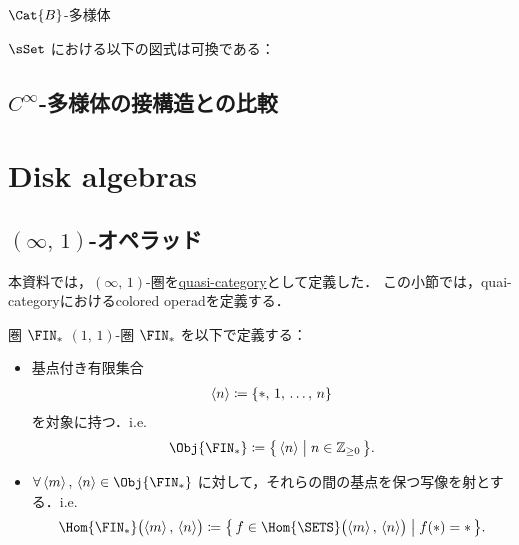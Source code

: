 \documentclass[TQFT_main]{subfiles}
\begin{document}
\begin{mydef}[label=def:B-mfld,breakable]{{$\Cat{B}$}-多様体}
\begin{itemize}
\begin{description}
            $\sSet$ における以下の図式は可換である：
            \begin{center}
            \end{center}
        \end{description}
    \end{itemize}
\end{mydef}

\subsection{$C^\infty$-多様体の接構造との比較}

\section{Disk algebras}

\subsection{{$(\infty,\, 1)$}-オペラッド}

本資料では，$(\infty,\, 1)$-圏を\hyperref[def:infinity-1]{quasi-category}として定義した．
この小節では，quai-categoryにおけるcolored operadを定義する．

\begin{mydef}[label=def:Fin]{圏 {$\FIN_*$}}
    $(1,\, 1)$-圏 $\FIN_*$ を以下で定義する：
    \begin{itemize}
        \item 基点付き有限集合
        \begin{align}
            \expval{n} \coloneqq \{*,\, 1,\, \dots,\, n\}
        \end{align}
        を対象に持つ．i.e.
        \begin{align}
            \Obj{\FIN_*} \coloneqq \bigl\{\, \expval{n} \bigm| n \in \mathbb{Z}_{\ge 0} \,\bigr\}.
        \end{align}
        \item $\forall \expval{m},\, \expval{n} \in \Obj{\FIN_*}$ に対して，それらの間の基点を保つ写像を射とする．i.e.
        \begin{align}
            \Hom{\FIN_*}\bigl( \expval{m},\, \expval{n} \bigr)  \coloneqq \bigl\{\, f \in \Hom{\SETS} \bigl( \expval{m},\, \expval{n} \bigr)  \bigm| f(*) = * \,\bigr\}.
        \end{align}
    \end{itemize}
\end{mydef}
\end{document}
